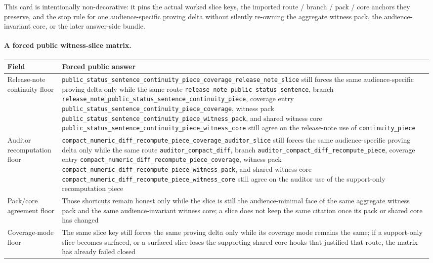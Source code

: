 \documentclass[11pt]{article}
\begin{document}
This card is intentionally non-decorative: it pins the actual worked slice keys, the imported route / branch / pack / core anchors they preserve, and the stop rule for one audience-specific proving delta without silently re-owning the aggregate witness pack, the audience-invariant core, or the later answer-side bundle.\cite{series:workedexample}

\paragraph{A forced public witness-slice matrix.}
\begin{table}[t]
\centering
\small
\begin{tabularx}{\linewidth}{@{}LY@{}}
\toprule
Field & Forced public answer \\
\midrule
Release-note continuity floor & \nolinkurl{public_status_sentence_continuity_piece_coverage_release_note_slice} still forces the same audience-specific proving delta only while the same route \nolinkurl{release_note_public_status_sentence}, branch \nolinkurl{release_note_public_status_sentence_continuity_piece}, coverage entry \nolinkurl{public_status_sentence_continuity_piece_coverage}, witness pack \nolinkurl{public_status_sentence_continuity_piece_witness_pack}, and shared witness core \nolinkurl{public_status_sentence_continuity_piece_witness_core} still agree on the release-note use of \nolinkurl{continuity_piece} \\
Auditor recomputation floor & \nolinkurl{compact_numeric_diff_recompute_piece_coverage_auditor_slice} still forces the same audience-specific proving delta only while the same route \nolinkurl{auditor_compact_diff}, branch \nolinkurl{auditor_compact_diff_recompute_piece}, coverage entry \nolinkurl{compact_numeric_diff_recompute_piece_coverage}, witness pack \nolinkurl{compact_numeric_diff_recompute_piece_witness_pack}, and shared witness core \nolinkurl{compact_numeric_diff_recompute_piece_witness_core} still agree on the auditor use of the support-only recomputation piece \\
Pack/core agreement floor & Those shortcuts remain honest only while the slice is still the audience-minimal face of the same aggregate witness pack and the same audience-invariant witness core; a slice does not keep the same citation once its pack or shared core has changed \\
Coverage-mode floor & The same slice key still forces the same proving delta only while its coverage mode remains the same; if a support-only slice becomes surfaced, or a surfaced slice loses the supporting shared core hooks that justified that route, the matrix has already failed closed \\

\end{tabularx}
\end{table}
\end{document}
